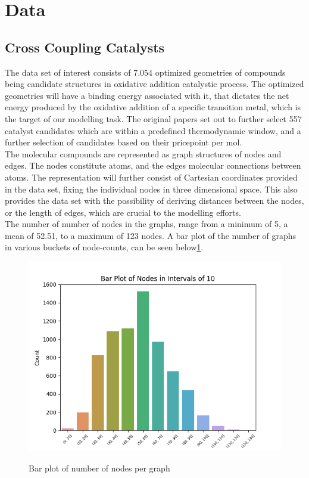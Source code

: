 \section{Data}\label{sec:data}

\subsection{Cross Coupling Catalysts}


The data set of interest consists of 7.054 optimized geometries of compounds being candidate structures in oxidative addition 
catalystic process. The optimized geometries will have a binding energy associated with it, that dictates the net energy 
produced by the oxidative addition of a specific transition metal\cite{Meyer2018}, which is the target of our modelling task. 
The original papers set out to further select 557 catalyst candidates which are within a predefined thermodynamic window, and a 
further selection of candidates based on their pricepoint per mol.\\

The molecular compounds are represented as graph structures of nodes and edges. The nodes constitute atoms, and the edges molecular 
connections between atoms. The representation will further consist of Cartesian coordinates provided in the data set, fixing the 
individual nodes in three dimensional space. This also provides the data set with the possibility of deriving distances between the 
nodes, or the length of edges, which are crucial to the modelling efforts.\\ 

The number of number of nodes in the graphs, range from a minimum of 5, a mean of 52.51, to a maximum of 123 nodes. 
A bar plot of the number of graphs in various buckets of node-counts, can be seen below\ref{num_nodes}.\\

\begin{figure}[H]
\caption{Bar plot of number of nodes per graph}
\centering\label{num_nodes}
\includegraphics[width=\textwidth]{Images/Data/num_nodes_dataset.png}
\end{figure}

